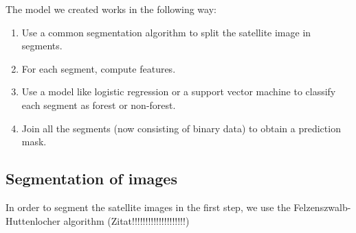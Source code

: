 The model we created works in the following way:
\begin{enumerate}
	\item Use a common segmentation algorithm to split the satellite image in segments.
	\item For each segment, compute features.
	\item Use a model like logistic regression or a support vector machine to classify each segment as forest or non-forest.
	\item Join all the segments (now consisting of binary data) to obtain a prediction mask.
\end{enumerate}

\subsection{Segmentation of images}
In order to segment the satellite images in the first step, we use the Felzenszwalb-Huttenlocher algorithm (Zitat!!!!!!!!!!!!!!!!!!!!)
